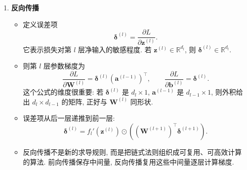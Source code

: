 \documentclass{../nndlcourse}
\begin{document}
\begin{enumerate}
    \item \textbf{反向传播}
    \begin{itemize}
        \item 定义误差项
        \[
            \boldsymbol{\delta}^{(l)}
            =
            \frac{\partial L}{\partial \boldsymbol{z}^{(l)}}.
        \]
        它表示损失对第 $l$ 层净输入的敏感程度. 若 $\boldsymbol{z}^{(l)}\in\mathbb{R}^{d_l}$, 则 $\boldsymbol{\delta}^{(l)}\in\mathbb{R}^{d_l}$.
        \item 则第 $l$ 层参数梯度为
        \[
            \frac{\partial L}{\partial \boldsymbol{W}^{(l)}}
            =
            \boldsymbol{\delta}^{(l)}
            {\left(\boldsymbol{a}^{(l-1)}\right)}^{\top},
            \qquad
            \frac{\partial L}{\partial \boldsymbol{b}^{(l)}}
            =
            \boldsymbol{\delta}^{(l)}.
        \]
        这个公式的维度很重要: 若 $\boldsymbol{\delta}^{(l)}$ 是 $d_l\times 1$, $\boldsymbol{a}^{(l-1)}$ 是 $d_{l-1}\times 1$, 则外积给出 $d_l\times d_{l-1}$ 的矩阵, 正好与 $\boldsymbol{W}^{(l)}$ 同形状.
        \item 误差项从后一层递推到前一层:
        \[
            \boldsymbol{\delta}^{(l)}
            =
            f_l'\left(\boldsymbol{z}^{(l)}\right)
            \odot
            \left(
                {\left(\boldsymbol{W}^{(l+1)}\right)}^\top
                \boldsymbol{\delta}^{(l+1)}
            \right).
        \]
        \item 反向传播不是新的求导规则, 而是把链式法则组织成可复用、可高效计算的算法. 前向传播保存中间量, 反向传播复用这些中间量逐层计算梯度.
    \end{itemize}


\end{enumerate}
\end{document}
